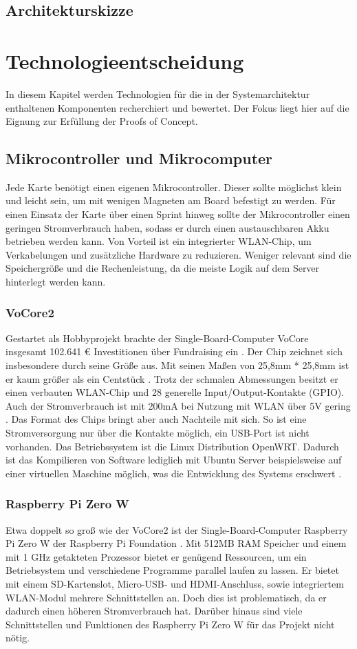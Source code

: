 \documentclass[12pt,titlepage]{scrartcl}
\begin{document}
		\subsection{Architekturskizze}
	\newpage	
	\section{Technologieentscheidung}
	In diesem Kapitel werden Technologien für die in der Systemarchitektur enthaltenen Komponenten recherchiert und bewertet. Der Fokus liegt hier auf die Eignung zur Erfüllung der Proofs of Concept.
		\subsection{Mikrocontroller und Mikrocomputer}
		Jede Karte benötigt einen eigenen Mikrocontroller. Dieser sollte möglichst klein und leicht sein, um mit wenigen Magneten am Board befestigt zu werden. Für einen Einsatz der Karte über einen Sprint hinweg sollte der Mikrocontroller einen geringen Stromverbrauch haben, sodass er durch einen austauschbaren Akku betrieben werden kann. Von Vorteil ist ein integrierter WLAN-Chip, um Verkabelungen und zusätzliche Hardware zu reduzieren. Weniger relevant sind die Speichergröße und die Rechenleistung, da die meiste Logik auf dem Server hinterlegt werden kann. 
			\subsubsection{VoCore2}
			Gestartet als Hobbyprojekt brachte der Single-Board-Computer VoCore insgesamt 102.641 \euro{} Investitionen über Fundraising ein \cite{vocorefundraising}. Der Chip zeichnet sich insbesondere durch seine Größe aus. Mit seinen Maßen von 25,8mm * 25,8mm ist er kaum größer als ein Centstück \cite{vocoregeneral}. Trotz der schmalen Abmessungen besitzt er einen verbauten WLAN-Chip und 28 generelle Input/Output-Kontakte (GPIO). Auch der Stromverbrauch ist mit 200mA bei Nutzung mit WLAN über 5V gering \cite{vocorepower}. Das Format des Chips bringt aber auch Nachteile mit sich. So ist eine Stromversorgung nur über die Kontakte möglich, ein USB-Port ist nicht vorhanden. Das Betriebssystem ist die Linux Distribution OpenWRT. Dadurch ist das Kompilieren von Software lediglich mit Ubuntu Server beispielsweise auf einer virtuellen Maschine möglich, was die Entwicklung des Systems erschwert \cite{vocorecompile}.
			\subsubsection{Raspberry Pi Zero W}
			Etwa doppelt so groß wie der VoCore2 ist der Single-Board-Computer Raspberry Pi Zero W der Raspberry Pi Foundation \cite{pizerowgeneral}. Mit 512MB RAM Speicher und einem mit 1 GHz getakteten Prozessor bietet er genügend Ressourcen, um ein Betriebsystem und verschiedene Programme parallel laufen zu lassen. Er bietet mit einem SD-Kartenslot, Micro-USB- und HDMI-Anschluss, sowie integriertem WLAN-Modul mehrere Schnittstellen an. Doch dies ist problematisch, da er dadurch einen höheren Stromverbrauch hat. Darüber hinaus sind viele Schnittstellen und Funktionen des Raspberry Pi Zero W für das Projekt nicht nötig.
\end{document}
